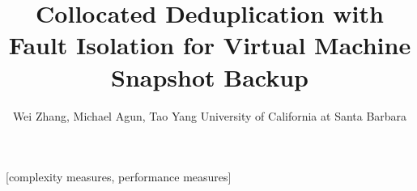 \documentclass{acm_proc_article-sp}
\begin{document}
\title{Collocated Deduplication with Fault Isolation for Virtual Machine Snapshot Backup}



\author{
Wei Zhang, Michael Agun,  Tao Yang
University of California at Santa Barbara
}



\maketitle



[complexity measures, performance measures]




%


%
%
%
%
%





\end{document}

